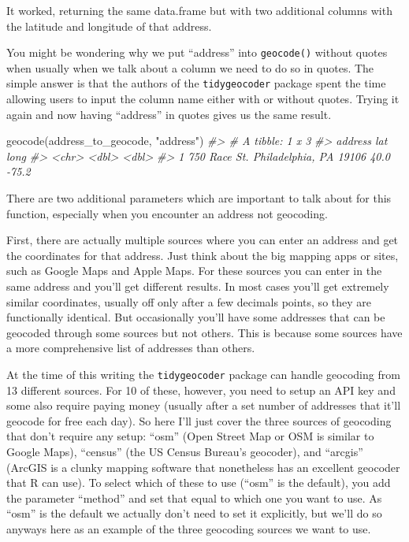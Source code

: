\documentclass[
]{krantz}
\makeatletter
\newenvironment{Shaded}{\begin{snugshade}}{\end{snugshade}}
\newcommand{\CommentTok}[1]{\textcolor[rgb]{0.37,0.37,0.37}{\textit{#1}}}
\newcommand{\FunctionTok}[1]{\textcolor[rgb]{0,0,0}{#1}}
\newcommand{\NormalTok}[1]{#1}
\newcommand{\StringTok}[1]{\textcolor[rgb]{0.5,0.5,0.5}{#1}}
\newenvironment{kframe}{%
\medskip{}
\setlength{\fboxsep}{.8em}
 \def\at@end@of@kframe{}%
 \ifinner\ifhmode%
  \def\at@end@of@kframe{\end{minipage}}%
  \begin{minipage}{\columnwidth}%
 \fi\fi%
 \def\FrameCommand##1{\hskip\@totalleftmargin \hskip-\fboxsep
 \colorbox{shadecolor}{##1}\hskip-\fboxsep
     \hskip-\linewidth \hskip-\@totalleftmargin \hskip\columnwidth}%
 \MakeFramed {\advance\hsize-\width
   \@totalleftmargin\z@ \linewidth\hsize
   \@setminipage}}%
 {\par\unskip\endMakeFramed%
 \at@end@of@kframe}
\renewenvironment{Shaded}{\begin{kframe}}{\end{kframe}}
\makeatother
\begin{document}
It worked, returning the same data.frame but with two additional columns with the latitude and longitude of that address.

You might be wondering why we put ``address'' into \texttt{geocode()} without quotes when usually when we talk about a column we need to do so in quotes. The simple answer is that the authors of the \texttt{tidygeocoder} package spent the time allowing users to input the column name either with or without quotes. Trying it again and now having ``address'' in quotes gives us the same result.

\begin{Shaded}
\begin{Highlighting}[]
\FunctionTok{geocode}\NormalTok{(address\_to\_geocode, }\StringTok{"address"}\NormalTok{)}
\CommentTok{\#\textgreater{} \# A tibble: 1 x 3}
\CommentTok{\#\textgreater{}   address                               lat  long}
\CommentTok{\#\textgreater{}   \textless{}chr\textgreater{}                               \textless{}dbl\textgreater{} \textless{}dbl\textgreater{}}
\CommentTok{\#\textgreater{} 1 750 Race St. Philadelphia, PA 19106  40.0 {-}75.2}
\end{Highlighting}
\end{Shaded}

There are two additional parameters which are important to talk about for this function, especially when you encounter an address not geocoding.

First, there are actually multiple sources where you can enter an address and get the coordinates for that address. Just think about the big mapping apps or sites, such as Google Maps and Apple Maps. For these sources you can enter in the same address and you'll get different results. In most cases you'll get extremely similar coordinates, usually off only after a few decimals points, so they are functionally identical. But occasionally you'll have some addresses that can be geocoded through some sources but not others. This is because some sources have a more comprehensive list of addresses than others.

At the time of this writing the \texttt{tidygeocoder} package can handle geocoding from 13 different sources. For 10 of these, however, you need to setup an API key and some also require paying money (usually after a set number of addresses that it'll geocode for free each day). So here I'll just cover the three sources of geocoding that don't require any setup: ``osm'' (Open Street Map or OSM is similar to Google Maps), ``census'' (the US Census Bureau's geocoder), and ``arcgis'' (ArcGIS is a clunky mapping software that nonetheless has an excellent geocoder that R can use). To select which of these to use (``osm'' is the default), you add the parameter ``method'' and set that equal to which one you want to use. As ``osm'' is the default we actually don't need to set it explicitly, but we'll do so anyways here as an example of the three geocoding sources we want to use.
\end{document}
